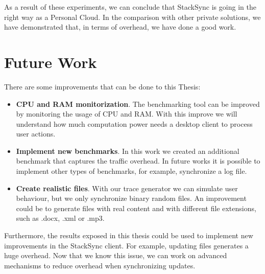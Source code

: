 As a result of these experiments, we can conclude that StackSync is going in the right
way as a Personal Cloud. In the comparison with other private solutions, we have demonstrated that,
in terms of overhead, we have done a good work.

\section{Future Work}
There are some improvements that can be done to this Thesis:

\begin{itemize}
	\item \textbf{CPU and RAM monitorization}. The benchmarking tool can be improved by monitoring
	the usage of CPU and RAM. With this improve we will understand how much computation power
	needs a desktop client to process user actions.
	\item \textbf{Implement new benchmarks}. In this work we created an additional benchmark that captures
	the traffic overhead. In future works it is possible to implement other types of benchmarks, for example,
	synchronize a log file.
	\item \textbf{Create realistic files}. With our trace generator we can simulate user behaviour, but
	we only synchronize binary random files. An improvement could be to generate files with real content
	and with different file extensions, such as .docx, .xml or .mp3.
\end{itemize}

Furthermore, the results exposed in this thesis could be used to implement new improvements in the StackSync
client. For example, updating files generates a huge overhead. Now that we know this issue, we can work
on advanced mechanisms to reduce overhead when synchronizing updates.
